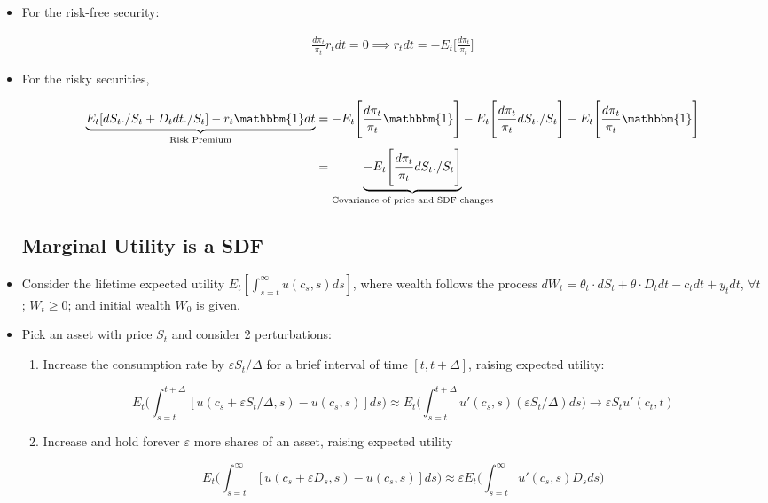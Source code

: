 \documentclass{article}
\newcommand{\onebf}{\mathbbm{1}}
\begin{document}
\begin{itemize}
\item For the risk-free security:

\begin{align}
\frac{d \pi_t}{\pi_t} r_t dt = 0 \implies r_t dt = - E_t\Bigg[\frac{d\pi_t}{\pi_t} \Bigg] \label{rfr}
\end{align}

\item For the risky securities,

\begin{align}
\underbrace{E_t[dS_t./S_t + D_t dt ./S_t] - r_t \onebf dt}_{\text{Risk Premium}} 
&= - E_t\Bigg[\frac{d\pi_t}{\pi_t} \onebf\Bigg] - E_t\Bigg[\frac{d\pi_t}{\pi_t} dS_t ./S_t\Bigg]- E_t\Bigg[\frac{d\pi_t}{\pi_t} \onebf\Bigg] \nonumber \\
&= \underbrace{- E_t\Bigg[\frac{d\pi_t}{\pi_t} dS_t ./S_t\Bigg]}_{\text{Covariance of price and SDF changes}} \label{rp}
\end{align}

\subsection*{Marginal Utility is a SDF}

\item Consider the lifetime expected utility $E_t [\int_{s=t}^\infty u(c_s, s)ds]$, where wealth follows the process $dW_t = \theta_t \cdot dS_t + \theta \cdot D_t dt - c_t dt + y_t dt$, $\forall t$; $W_t \ge 0$; and initial wealth $W_0$ is given.

\item Pick an asset with price $S_t$ and consider 2 perturbations:

\begin{enumerate}

\item Increase the consumption rate by $\varepsilon S_t / \Delta$ for a brief interval of time $[t, t+\Delta]$, raising expected utility:

$$
E_t \Bigg( \int_{s=t}^{t + \Delta} [u(c_s + \varepsilon S_t / \Delta, s) - u(c_s, s)] ds \Bigg)
\approx
E_t \Bigg( \int_{s=t}^{t + \Delta} u'(c_s, s) (\varepsilon S_t / \Delta) ds \Bigg)
\to
\varepsilon S_t u'(c_t, t)
$$

\item Increase and hold forever $\varepsilon$ more shares of an asset, raising expected utility

$$
E_t \Bigg( \int_{s=t}^{\infty} [u(c_s + \varepsilon D_s, s) - u(c_s, s)] ds \Bigg)
\approx
\varepsilon E_t \Bigg( \int_{s=t}^{\infty} u'(c_s, s) D_s ds \Bigg)
$$


\end{enumerate}
\end{itemize}
\end{document}
